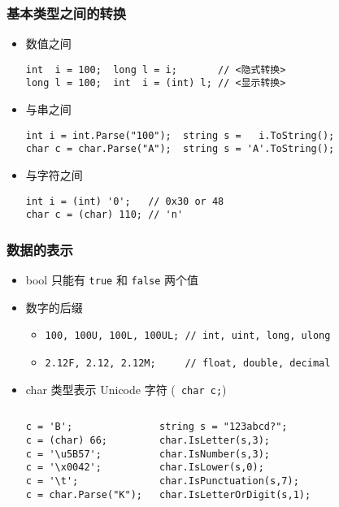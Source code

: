 \begin{frame}[fragile]
\frametitle{基本类型之间的转换}
\begin{itemize}
\item 数值之间
\begin{lstlisting}[escapeinside=<>]
int  i = 100;  long l = i;       // <隐式转换>
long l = 100;  int  i = (int) l; // <显示转换>
\end{lstlisting}
\pause
\item 与串之间
\begin{lstlisting}
int i = int.Parse("100");  string s =   i.ToString();
char c = char.Parse("A");  string s = 'A'.ToString();
\end{lstlisting}
\pause
\item 与字符之间
\begin{lstlisting}
int i = (int) '0';   // 0x30 or 48
char c = (char) 110; // 'n'
\end{lstlisting}
\end{itemize}
\end{frame}

\begin{frame}[fragile]
\frametitle{数据的表示}

\begin{itemize}
\item bool 只能有 \lstinline|true| 和 \lstinline|false| 两个值 \pause
\item 数字的后缀
  \begin{itemize}
  \item \lstinline|100, 100U, 100L, 100UL; // int, uint, long, ulong|
  \item \lstinline|2.12F, 2.12, 2.12M;     // float, double, decimal|
  \end{itemize}
\pause
\item char 类型表示 Unicode 字符 (\lstinline| char c;|)
  \begin{columns}
\begin{lstlisting}
c = 'B';
c = (char) 66;
c = '\u5B57';
c = '\x0042';
c = '\t';
c = char.Parse("K");
\end{lstlisting}
\begin{lstlisting}
string s = "123abcd?";
char.IsLetter(s,3);
char.IsNumber(s,3);
char.IsLower(s,0);
char.IsPunctuation(s,7);
char.IsLetterOrDigit(s,1);
\end{lstlisting}
  \end{columns}
\end{itemize}
\end{frame}

